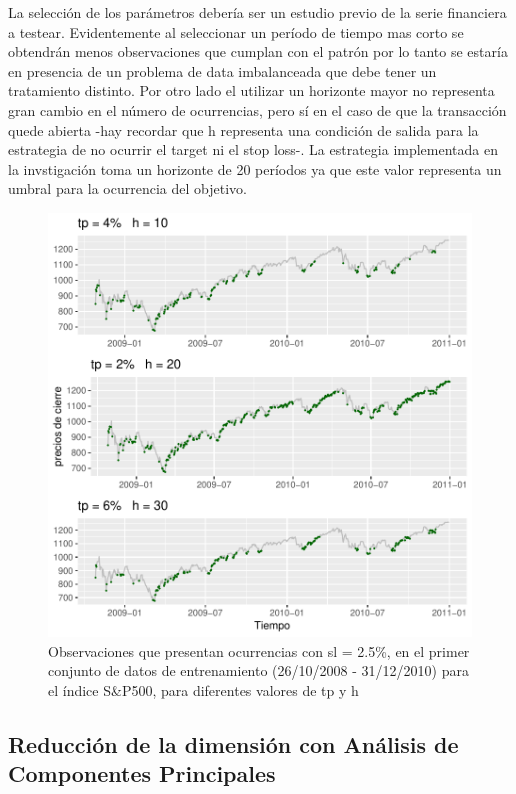 \documentclass[a4paper,12pt]{Latex/Classes/PhDthesisPSnPDF}
\begin{document}
La selección de los parámetros debería ser un estudio previo de la serie financiera a testear. Evidentemente al seleccionar un período de tiempo mas corto se obtendrán menos observaciones que cumplan con el patrón por lo tanto se estaría en presencia de un problema de data imbalanceada que debe tener un tratamiento distinto. Por otro lado el utilizar un horizonte mayor no representa gran cambio en el número de ocurrencias, pero sí en el caso de que la transacción quede abierta -hay recordar que h representa una condición de salida para la estrategia de no ocurrir el target ni el stop loss-. La estrategia implementada en la invstigación toma un horizonte de 20 períodos ya que este valor representa un umbral para la ocurrencia del objetivo.


\begin{figure}[H]
\centering
\includegraphics{main-004}
\caption{Observaciones que presentan ocurrencias con sl = 2.5\%, en el primer conjunto de datos de entrenamiento (26/10/2008 - 31/12/2010) para el índice S&P500, para diferentes valores de tp y h}
\end{figure}

\subsection{Reducción de la dimensión con Análisis de Componentes Principales}
\end{document}
